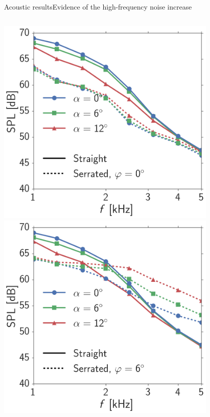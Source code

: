 \documentclass[xcolor=table,aspectratio=169]{beamer}
\begin{document}
\begin{frame}{Acoustic results}{Evidence of the high-frequency noise increase}

    \begin{columns}
        \vspace{-2cm}
        \centering
        \includegraphics[width=0.8\textwidth]{scripts/acoustics/article_images/case35_spectra_p0.png}
        \vspace{-2cm}
        \centering
        \includegraphics[width=0.8\textwidth]{scripts/acoustics/article_images/case35_spectra_p6.png}
    \end{columns}
    
\end{frame}
\end{document}
